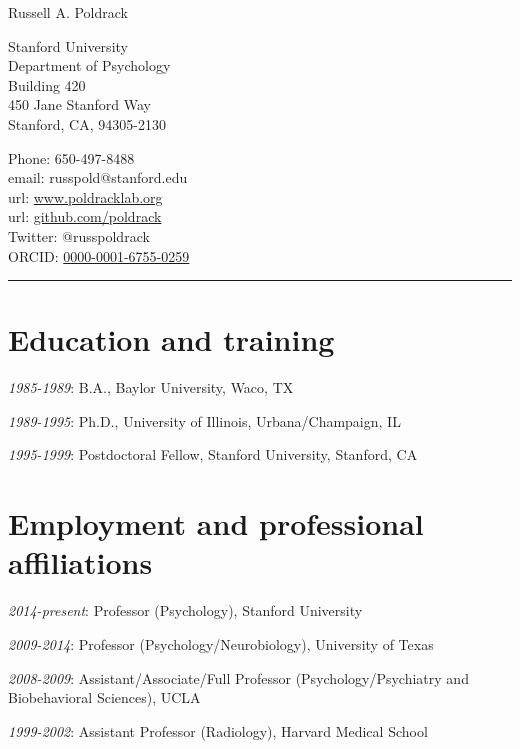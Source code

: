 \documentclass[10pt, letterpaper]{article}
\begin{document}
\reversemarginpar 
{\LARGE Russell A. Poldrack}\\[4mm] 
\vspace{-1cm} 

\begin{multicols}{2} 
Stanford University\\
Department of Psychology\\
Building 420\\
450 Jane Stanford Way\\
Stanford, CA, 94305-2130\\

\columnbreak 

Phone: 650-497-8488 \\
email: russpold@stanford.edu \\
url: \href{http://www.poldracklab.org}{www.poldracklab.org} \\
url: \href{http://github.com/poldrack}{github.com/poldrack} \\
Twitter: @russpoldrack \\
ORCID: \href{https://orcid.org/0000-0001-6755-0259}{0000-0001-6755-0259} \\
\end{multicols}

\hrule

\section*{Education and training}
\noindent
\textit{1985-1989}: B.A., Baylor University, Waco, TX

\textit{1989-1995}: Ph.D., University of Illinois, Urbana/Champaign, IL

\textit{1995-1999}: Postdoctoral Fellow, Stanford University, Stanford, CA


\section*{Employment and professional aﬀiliations}
\noindent

\textit{2014-present}: Professor (Psychology), Stanford University

\textit{2009-2014}: Professor (Psychology/Neurobiology), University of Texas

\textit{2008-2009}: Assistant/Associate/Full Professor (Psychology/Psychiatry and Biobehavioral Sciences), UCLA

\textit{1999-2002}: Assistant Professor (Radiology), Harvard Medical School
\end{document}
